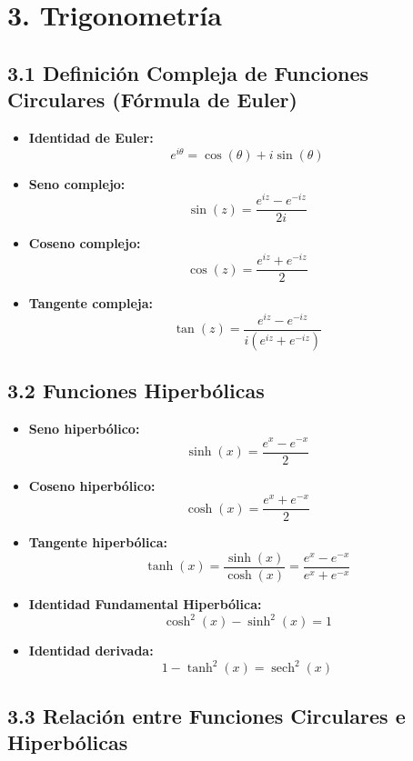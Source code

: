 \documentclass[11pt,a4paper]{article}
\begin{document}
\section*{3. Trigonometría}

\subsection*{3.1 Definición Compleja de Funciones Circulares (Fórmula de Euler)}

\begin{itemize}
  \item \textbf{Identidad de Euler:}
  \[
    e^{i\theta} = \cos(\theta) + i\sin(\theta)
  \]
  \item \textbf{Seno complejo:}
  \[
    \sin(z) = \frac{e^{iz} - e^{-iz}}{2i}
  \]
  \item \textbf{Coseno complejo:}
  \[
    \cos(z) = \frac{e^{iz} + e^{-iz}}{2}
  \]
  \item \textbf{Tangente compleja:}
  \[
    \tan(z) = \frac{e^{iz} - e^{-iz}}{i(e^{iz} + e^{-iz})}
  \]
\end{itemize}

\subsection*{3.2 Funciones Hiperbólicas}

\begin{itemize}
  \item \textbf{Seno hiperbólico:}
  \[
    \sinh(x) = \frac{e^x - e^{-x}}{2}
  \]
  \item \textbf{Coseno hiperbólico:}
  \[
    \cosh(x) = \frac{e^x + e^{-x}}{2}
  \]
  \item \textbf{Tangente hiperbólica:}
  \[
    \tanh(x) = \frac{\sinh(x)}{\cosh(x)} = \frac{e^x - e^{-x}}{e^x + e^{-x}}
  \]
  \item \textbf{Identidad Fundamental Hiperbólica:}
  \[
    \cosh^2(x) - \sinh^2(x) = 1
  \]
  \item \textbf{Identidad derivada:}
  \[
    1 - \tanh^2(x) = \operatorname{sech}^2(x)
  \]
\end{itemize}

\subsection*{3.3 Relación entre Funciones Circulares e Hiperbólicas}
\end{document}
